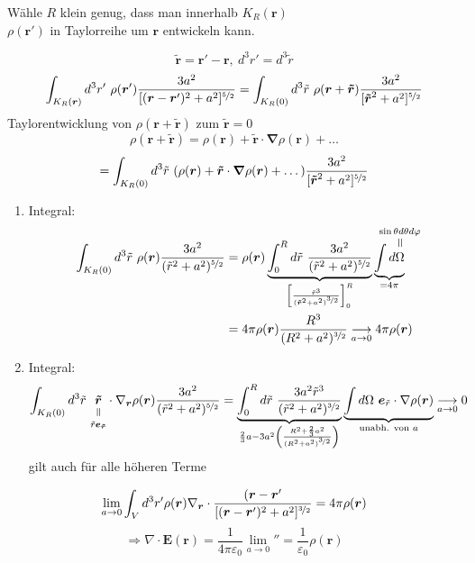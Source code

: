 \documentclass[titlepage,11pt,a4paper,ngerman]{report}
\newcommand{\verteq}{\rotatebox{90}{$\,=$}}
\newcommand{\equalto}[2]{\underset{\scriptstyle\overset{\mkern4mu\verteq}{#2}}{#1}}
\newcommand{\equaltoup}[2]{\overset{\scriptstyle\underset{\mkern4mu\verteq}{#2}}{#1}}
\newcommand{\kq}{\frac{1}{4\pi\epsilon_0}}
\newcommand{\intt}[2]{\int_{#1}^{#2}}
\renewcommand{\vec}[1]{\boldsymbol{#1}}
\renewcommand{\epsilon}{\varepsilon}
\newcommand{\vabla}{\boldsymbol{\nabla}}
\begin{document}
Wähle $R$ klein genug, dass man innerhalb $K_R (\vec{r})$\\
$\rho(\vec{r}')$ in Taylorreihe um $\vec{r}$ entwickeln kann.

$$\vec{\tilde{r}} = \vec{r}' - \vec{r},\ d^3 r' = d^3 \tilde{r}$$
$$\int_{K_R (\vec{r})} d^3 r' \ \rho(\vec{r}') \frac{3a^2}{[(\vec{r}-\vec{r}')^2 + a^2]^{\nicefrac{5}{2}}} = \int_{K_R (0)} d^3 \tilde{r} \ \rho(\vec{r} + \vec{\tilde{r}}) \frac{3a^2}{[\vec{\tilde{r}}^2 + a^2]^{\nicefrac{5}{2}}}$$
Taylorentwicklung von $\rho(\vec{r} + \vec{\tilde{r}})$ zum $\vec{\tilde{r}} = 0$
$$\rho(\vec{r} + \vec{\tilde{r}}) = \rho(\vec{r}) + \vec{\tilde{r}} \cdot \vabla \rho(\vec{r}) + \dots$$
$$= \int_{K_R (0)} d^3 \tilde{r} \ (\rho(\vec{r}) + \vec{\tilde{r}} \cdot \vabla \rho(\vec{r}) + \dots) \frac{3a^2}{[\vec{\tilde{r}}^2 + a^2]^{\nicefrac{5}{2}}}$$

\begin{enumerate}
	\item Integral:
	\begin{align*}
	\int_{K_R (0)} d^3 \tilde r\ \rho(\vec{r}) \frac{3a^2}{(\tilde{r}^2 + a^2)^{\nicefrac{5}{2}}} &= \rho(\vec{r}) \underbrace{\intt{0}{R} d\tilde r\ \frac{3a^2}{(\tilde{r}^2 + a^2)^{\nicefrac{5}{2}}}}_{\left[\frac{\tilde r^3}{(\vec{\tilde{r}}^2 + a^2)^{\nicefrac{3}{2}}}\right]_0^R} \underbrace{\int d \equaltoup{\Omega}{\mathclap{\sin \theta d \theta d \varphi}}}_{= 4\pi}\\
	&= 4 \pi \rho(\vec{r}) \frac{R^3}{(R^2 + a^2)^{\nicefrac{3}{2}}} \underset{a \to 0}{\longrightarrow} 4 \pi \rho(\vec{r})
	\end{align*} 
	\item Integral:
	$$\int_{K_R (0)} d^3 \tilde{r}\ \equalto{\vec{\tilde{r}}}{\tilde{r}\vec{e}_{\vec{\tilde{r}}}} \cdot \nabla_{\vec{r}} \rho(\vec{r}) \frac{3 a^2}{(\tilde{r}^2 + a^2)^{\nicefrac{5}{2}}} = \underbrace{\intt{0}{R} d \tilde r\ \frac{3a^2 \tilde r^3}{(\tilde r^2 + a^2)^{\nicefrac{3}{2}}}}_{\frac{2}{3}a -3a^2 \left(\frac{R^2 +\frac{2}{3}a^2}{(R^2 + a^2)^{\nicefrac{3}{2}}}\right)} \underbrace{\int d \Omega\ \vec{e}_{\tilde{r}} \cdot \nabla \rho(\vec{r})}_{\textrm{unabh. von } a} \underset{a \to 0}{\longrightarrow} 0$$
	gilt auch für alle höheren Terme
\end{enumerate}

$$\lim_{a \to 0} \int_V d^3 r' \rho(\vec{r}) \nabla_{\vec{r}}\cdot \frac{(\vec{r}-\vec{r}'}{[(\vec{r}-\vec{r}')^2 + a^2]^{\nicefrac{3}{2}}} = 4 \pi \rho (\vec{r})$$
$$\Rightarrow \nabla \cdot \vec{E}(\vec{r}) = \kq \lim_{a \to 0} '' = \frac{1}{\epsilon_0} \rho(\vec{r})$$
\end{document}
